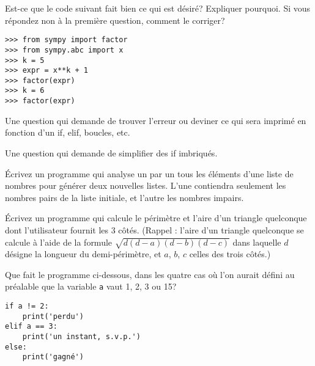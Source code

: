 \begin{exercice}
Est-ce que le code suivant fait bien ce qui est désiré? Expliquer pourquoi.
Si vous répondez non à la première question, comment le corriger?
\begin{verbatim}
>>> from sympy import factor
>>> from sympy.abc import x
>>> k = 5
>>> expr = x**k + 1
>>> factor(expr)
>>> k = 6
>>> factor(expr)
\end{verbatim}
\end{exercice}


\begin{question}
    Une question qui demande de trouver l'erreur ou deviner ce qui sera
    imprimé en fonction d'un if, elif, boucles, etc.
\end{question}

\begin{question}
    Une question qui demande de simplifier des if imbriqués.
\end{question}

\begin{question}
Écrivez un programme qui analyse un par un tous les éléments d’une liste de
nombres pour générer deux nouvelles listes. L’une contiendra seulement les
nombres pairs de la liste initiale, et l’autre les nombres impairs.
\end{question}

\begin{question}
Écrivez un programme qui calcule le périmètre et l’aire d’un triangle quelconque
dont l’utilisateur fournit les 3 côtés.
(Rappel : l’aire d’un triangle quelconque se calcule à l’aide de la formule
$\sqrt{d(d-a)(d-b)(d-c)}$ dans laquelle $d$ désigne la longueur du
demi-périmètre, et $a$, $b$, $c$ celles des trois côtés.)
\end{question}

\begin{question}
Que fait le programme ci-dessous, dans les quatre cas où l'on aurait défini au
préalable que la variable \texttt{a} vaut 1, 2, 3 ou 15?
\begin{verbatim}
if a != 2: 
    print('perdu')
elif a == 3:
    print('un instant, s.v.p.')
else: 
    print('gagné')
\end{verbatim}
\end{question}

